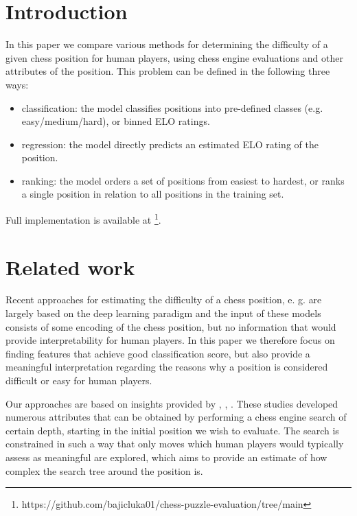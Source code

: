 \documentclass[sigconf,nonacm]{acmart}
\begin{document}
\maketitle

\section{Introduction}

In this paper we compare various methods for determining the difficulty of a given chess position for human players, using chess engine evaluations and other attributes of the position. This problem can be defined in the following three ways:

\begin{itemize}
\item classification: the model classifies positions into pre-defined classes (e.g. easy/medium/hard), or binned ELO ratings.
\item regression: the model directly predicts an estimated ELO rating of the position.
\item ranking: the model orders a set of positions from easiest to hardest, or ranks a single position in relation to all positions in the training set.
\end{itemize}

Full implementation is available at \footnote{https://github.com/bajicluka01/chess-puzzle-evaluation/tree/main}.

\section{Related work}

Recent approaches for estimating the difficulty of a chess position, e. g. \cite{deep} are largely based on the deep learning paradigm and the input of these models consists of some encoding of the chess position, but no information that would provide interpretability for human players. In this paper we therefore focus on finding features that achieve good classification score, but also provide a meaningful interpretation regarding the reasons why a position is considered difficult or easy for human players. 

Our approaches are based on insights provided by \cite{bratko2}, \cite{bratko}, \cite{bratko3}. These studies developed numerous attributes that can be obtained by performing a chess engine search of certain depth, starting in the initial position we wish to evaluate. The search is constrained in such a way that only moves which human players would typically assess as meaningful are explored, which aims to provide an estimate of how complex the search tree around the position is. 
\end{document}
